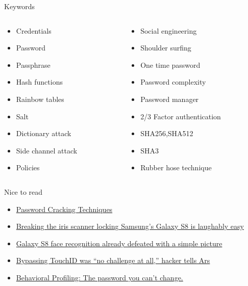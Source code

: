 \documentclass{curs}
\begin{document}
\begin{frame}{Keywords}
  \begin{columns}
    \begin{column}{0.5\textwidth}
      \begin{itemize}
        \item Credentials
        \item Password
        \item Passphrase
        \item Hash functions
        \item Rainbow tables
        \item Salt
        \item Dictionary attack
        \item Side channel attack
        \item Policies
      \end{itemize}
    \end{column}
    \begin{column}{0.5\textwidth}
      \begin{itemize}
        \item Social engineering
        \item Shoulder surfing
        \item One time password
        \item Password complexity
        \item Password manager
        \item 2/3 Factor authentication
        \item SHA256,SHA512
        \item SHA3
        \item Rubber hose technique
      \end{itemize}
    \end{column}
  \end{columns}
\end{frame}

\begin{frame}{Nice to read}
  \begin{itemize}
    \item \href{http://books.expect-us.net/dl/Password_Cracking_Techniques.pdf}{Password Cracking Techniques}
    \item \href{https://arstechnica.com/information-technology/2017/05/breaking-the-iris-scanner-locking-samsungs-galaxy-s8-is-laughably-easy/}{Breaking the iris scanner locking Samsung’s Galaxy S8 is laughably easy}
    \item \href{https://arstechnica.com/gadgets/2017/03/video-shows-galaxy-s8-face-recognition-can-be-defeated-with-a-picture/}{Galaxy S8 face recognition already defeated with a simple picture}
    \item \href{https://arstechnica.com/information-technology/2013/09/touchid-hack-was-no-challenge-at-all-hacker-tells-ars/}{Bypassing TouchID was “no challenge at all,” hacker tells Ars}
    \item \href{https://paul.reviews/behavioral-profiling-the-password-you-cant-change/}{Behavioral Profiling: The password you can't change.}
  \end{itemize}
\end{frame}
\end{document}
